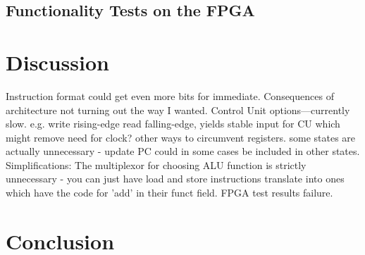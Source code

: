 \documentclass[11pt]{article}
\begin{document}
\subsection{Functionality Tests on the FPGA}
\label{subsec:functestfpga}

\section{Discussion}
\label{sec:discussion}

Instruction format could get even more bits for immediate. 
Consequences of architecture not turning out the way I wanted.
Control Unit options---currently slow. 
   e.g. write rising-edge read falling-edge, yields stable input for CU which might remove need for clock?
   other ways to circumvent registers.
   some states are actually unnecessary - update PC could in some cases be included in other states.
Simplifications:
    The multiplexor for choosing ALU function is strictly unnecessary - you can just have load and store instructions translate into ones which have the code for 'add' in their funct field.
FPGA test results failure.


\section{Conclusion}
\label{sec:conclusion}




\end{document}
